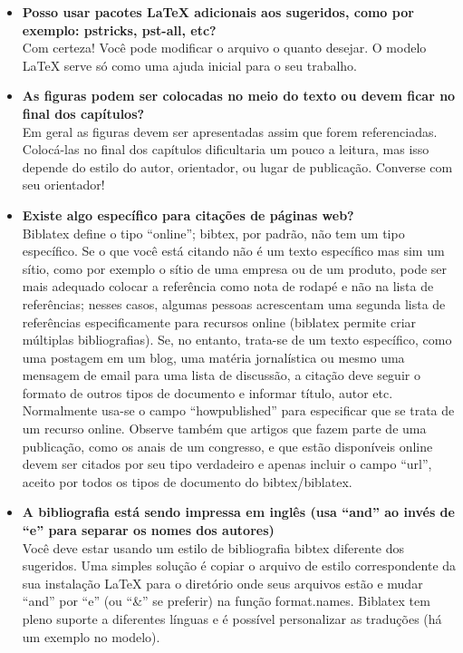 \begin{itemize}

\item \textbf{Posso usar pacotes \LaTeX{} adicionais aos sugeridos, como por exemplo: pstricks, pst-all, etc?}\\
Com certeza! Você pode modificar o arquivo o quanto desejar. O modelo \LaTeX{} serve só como uma ajuda inicial para o seu trabalho.

\item \textbf{As figuras podem ser colocadas no meio do texto ou devem ficar no final dos capítulos?}\\
Em geral as figuras devem ser apresentadas assim que forem referenciadas. Colocá-las no final dos capítulos dificultaria um pouco a leitura, mas isso depende do estilo do autor, orientador, ou lugar de publicação. Converse com seu orientador!

\item \textbf{Existe algo específico para citações de páginas web?}\\
Biblatex define o tipo ``online''; bibtex, por padrão, não tem um tipo específico. Se o que você está citando não é um texto específico mas sim um sítio, como por exemplo o sítio de uma empresa ou de um produto, pode ser mais adequado colocar a referência como nota de rodapé e não na lista de referências; nesses casos, algumas pessoas acrescentam uma segunda lista de referências especificamente para recursos online (biblatex  permite criar múltiplas bibliografias). Se, no entanto, trata-se de um texto específico, como uma postagem em um blog, uma matéria jornalística ou mesmo uma mensagem de email para uma lista de discussão, a citação deve seguir o formato de outros tipos de documento e informar título, autor etc. Normalmente usa-se o campo ``howpublished'' para especificar que se trata de um recurso online. Observe também que artigos que fazem parte de uma publicação, como os anais de um congresso, e que estão disponíveis online devem ser citados por seu tipo verdadeiro e apenas incluir o campo ``url'', aceito por todos os tipos de documento do bibtex/biblatex.

\item \textbf{A bibliografia está sendo impressa em inglês (usa ``and'' ao invés de ``e'' para separar os nomes dos autores)}\\
Você deve estar usando um estilo de bibliografia bibtex diferente dos sugeridos. Uma simples solução é copiar o arquivo de estilo correspondente da sua instalação \LaTeX{} para o diretório onde seus arquivos estão e mudar ``and'' por ``e'' (ou ``\&'' se preferir) na função format.names. Biblatex tem pleno suporte a diferentes línguas e é possível personalizar as traduções (há um exemplo no modelo).


\end{itemize}
